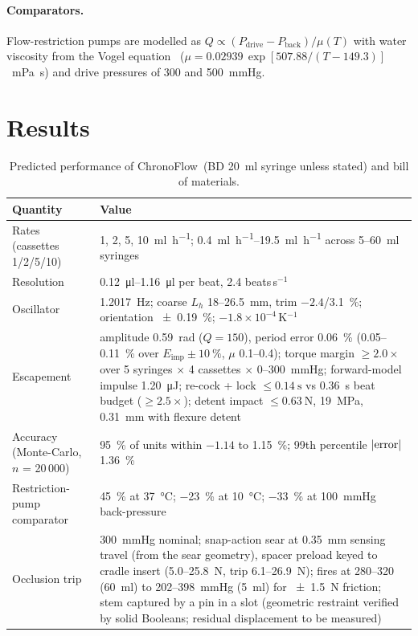 \documentclass[11pt,a4paper]{article}
\newcommand{\ChronoFlow}{ChronoFlow}
\begin{document}
\paragraph{Comparators.} Flow-restriction pumps are modelled as $Q \propto (P_{\mathrm{drive}} - P_{\mathrm{back}})/\mu(T)$ with water viscosity from the Vogel equation~\cite{vogel} ($\mu = 0.02939\,\exp[507.88/(T-149.3)]$~\si{\milli\pascal\second}) and drive pressures of 300 and \SI{500}{mmHg}.

\section{Results}
\begin{table}[t]
\centering\small
\caption{Predicted performance of \ChronoFlow\ (BD \SI{20}{\milli\litre} syringe unless stated) and bill of materials.}
\label{tab:summary}
\begin{tabular}{@{}p{}p{}@{}}
\toprule
Quantity & Value \\
\midrule
Rates (cassettes 1/2/5/10) & 1, 2, 5, \SI{10}{\milli\litre\per\hour}; \SIrange{0.4}{19.5}{\milli\litre\per\hour} across 5--\SI{60}{\milli\litre} syringes \\
Resolution & \SIrange{0.12}{1.16}{\micro\litre} per beat, 2.4 beats\,s$^{-1}$ \\
Oscillator & \SI{1.2017}{\hertz}; coarse $L_h$ 18--\SI{26.5}{\milli\metre}, trim $-2.4$/\SI{+3.1}{\percent}; orientation \SI{\pm 0.19}{\percent}; $-1.8\times10^{-4}$\,K$^{-1}$ \\
Escapement & amplitude \SI{0.59}{\radian} ($Q=150$), period error \SI{0.06}{\percent} (0.05--\SI{0.11}{\percent} over $E_{\mathrm{imp}}\pm\SI{10}{\percent}$, $\mu$ 0.1--0.4); torque margin $\geq 2.0\times$ over 5 syringes $\times$ 4 cassettes $\times$ 0--\SI{300}{mmHg}; forward-model impulse \SI{1.20}{\micro\joule}; re-cock + lock $\leq\SI{0.14}{\second}$ vs \SI{0.36}{\second} beat budget ($\geq 2.5\times$); detent impact $\leq\SI{0.63}{\newton}$, \SI{19}{\mega\pascal}, \SI{0.31}{\milli\metre} with flexure detent \\
Accuracy (Monte-Carlo, $n$ = 20\,000) & \SI{95}{\percent} of units within $-1.14$ to \SI{+1.15}{\percent}; 99th percentile $|{\rm error}|$ \SI{1.36}{\percent} \\
Restriction-pump comparator & \SI{+45}{\percent} at \SI{37}{\celsius}; \SI{-23}{\percent} at \SI{10}{\celsius}; \SI{-33}{\percent} at \SI{100}{mmHg} back-pressure \\
Occlusion trip & \SI{300}{mmHg} nominal; snap-action sear at \SI{0.35}{\milli\metre} sensing travel (from the sear geometry), spacer preload keyed to cradle insert (5.0--\SI{25.8}{\newton}, trip 6.1--\SI{26.9}{\newton}); fires at 280--320 (\SI{60}{\milli\litre}) to 202--\SI{398}{mmHg} (\SI{5}{\milli\litre}) for \SI{\pm 1.5}{\newton} friction; stem captured by a pin in a slot (geometric restraint verified by solid Booleans; residual displacement to be measured) \\

\end{tabular}
\end{table}
\end{document}
